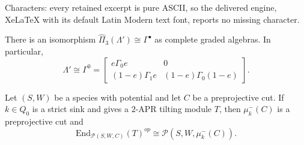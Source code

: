\documentclass[10pt,a4paper]{amsart}
\begin{document}
Characters: every retained excerpt is pure ASCII, so the delivered engine, XeLaTeX with its default Latin Modern text font, reports no missing character.
\begin{myprop}\label{proposition - degree shift for preprojective}
	There is an isomorphism $\widehat{\Pi}_3(\Lambda')\cong \Gamma^\bullet$ as complete graded algebras. In particular,
	\begin{equation*}
		\Lambda' \cong \Gamma^0 = \begin{bmatrix}
			e\Gamma_0 e & 0 \\
			(1- e)\Gamma_1 e & (1-e)\Gamma_0 (1-e)
		\end{bmatrix}.
	\end{equation*}
\end{myprop}

\begin{mythm}\label{theorem - cut and apr correspondence}
	Let $(S, W)$ be a species with potential and let $C$ be a preprojective cut. If $k\in Q_0$ is a strict sink and gives a $2$-APR tilting module $T$, then $\mu_k^-(C)$ is a preprojective cut and
	\begin{equation}\label{eq - cut and apr equation}
		\mathrm{End}_{\mathcal{P}(S, W, C)}(T)^{op} \cong \mathcal{P}(S, W, \mu_k^-(C)).
	\end{equation}
\end{mythm}
\end{document}
